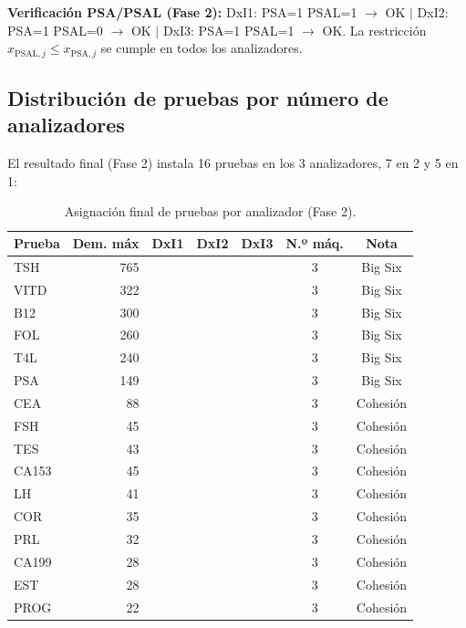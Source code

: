 \documentclass[12pt, a4paper]{article}
\newcommand{\cmark}{\ding{51}}
\begin{document}
\textbf{Verificación PSA/PSAL (Fase 2):}
DxI1: PSA=1 PSAL=1 $\to$ OK $\mid$ DxI2: PSA=1 PSAL=0 $\to$ OK $\mid$
DxI3: PSA=1 PSAL=1 $\to$ OK.
La restricción $x_{\text{PSAL},j} \leq x_{\text{PSA},j}$ se cumple en todos los
analizadores.

\subsection{Distribución de pruebas por número de analizadores}

El resultado final (Fase 2) instala 16 pruebas en los 3 analizadores, 7 en 2 y 5 en 1:

\begin{table}[H]
\centering
\caption{Asignación final de pruebas por analizador (Fase 2).}
\small
\begin{tabular}{lrccccc}
\toprule
\textbf{Prueba} & \textbf{Dem. máx} & \textbf{DxI1} & \textbf{DxI2} & \textbf{DxI3} & \textbf{N.º máq.} & \textbf{Nota} \\
\midrule
TSH   & 765 & \cmark & \cmark & \cmark & 3 & Big Six \\
VITD  & 322 & \cmark & \cmark & \cmark & 3 & Big Six \\
B12   & 300 & \cmark & \cmark & \cmark & 3 & Big Six \\
FOL   & 260 & \cmark & \cmark & \cmark & 3 & Big Six \\
T4L   & 240 & \cmark & \cmark & \cmark & 3 & Big Six \\
PSA   & 149 & \cmark & \cmark & \cmark & 3 & Big Six \\
CEA   &  88 & \cmark & \cmark & \cmark & 3 & Cohesión \\
FSH   &  45 & \cmark & \cmark & \cmark & 3 & Cohesión \\
TES   &  43 & \cmark & \cmark & \cmark & 3 & Cohesión \\
CA153 &  45 & \cmark & \cmark & \cmark & 3 & Cohesión \\
LH    &  41 & \cmark & \cmark & \cmark & 3 & Cohesión \\
COR   &  35 & \cmark & \cmark & \cmark & 3 & Cohesión \\
PRL   &  32 & \cmark & \cmark & \cmark & 3 & Cohesión \\
CA199 &  28 & \cmark & \cmark & \cmark & 3 & Cohesión \\
EST   &  28 & \cmark & \cmark & \cmark & 3 & Cohesión \\
PROG  &  22 & \cmark & \cmark & \cmark & 3 & Cohesión \\
\midrule

\end{tabular}
\end{table}
\end{document}
